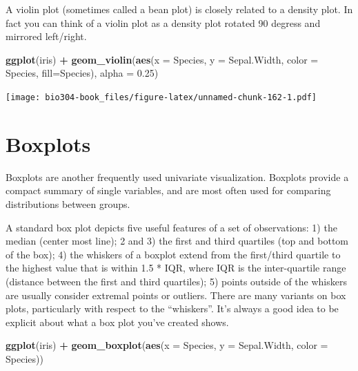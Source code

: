 \documentclass[]{book}
\newenvironment{Shaded}{\begin{snugshade}}{\end{snugshade}}
\newcommand{\DataTypeTok}[1]{\textcolor[rgb]{0.13,0.29,0.53}{#1}}
\newcommand{\FloatTok}[1]{\textcolor[rgb]{0.00,0.00,0.81}{#1}}
\newcommand{\KeywordTok}[1]{\textcolor[rgb]{0.13,0.29,0.53}{\textbf{#1}}}
\newcommand{\NormalTok}[1]{#1}
\newcommand{\OperatorTok}[1]{\textcolor[rgb]{0.81,0.36,0.00}{\textbf{#1}}}
\newcommand{\StringTok}[1]{\textcolor[rgb]{0.31,0.60,0.02}{#1}}
\theoremstyle{definition}
\theoremstyle{definition}
\theoremstyle{definition}
\theoremstyle{remark}
\begin{document}
A violin plot (sometimes called a bean plot) is closely related to a
density plot. In fact you can think of a violin plot as a density plot
rotated 90 degress and mirrored left/right.

\begin{Shaded}
\begin{Highlighting}[]
\KeywordTok{ggplot}\NormalTok{(iris) }\OperatorTok{+}\StringTok{ }
\StringTok{  }\KeywordTok{geom_violin}\NormalTok{(}\KeywordTok{aes}\NormalTok{(}\DataTypeTok{x =}\NormalTok{ Species, }\DataTypeTok{y =}\NormalTok{ Sepal.Width, }\DataTypeTok{color =}\NormalTok{ Species, }\DataTypeTok{fill=}\NormalTok{Species), }
              \DataTypeTok{alpha =} \FloatTok{0.25}\NormalTok{)}
\end{Highlighting}
\end{Shaded}

\texttt{[image: bio304-book\_files/figure-latex/unnamed-chunk-162-1.pdf]}

\hypertarget{boxplots}{%
\section{Boxplots}\label{boxplots}}

Boxplots are another frequently used univariate visualization. Boxplots
provide a compact summary of single variables, and are most often used
for comparing distributions between groups.

A standard box plot depicts five useful features of a set of
observations: 1) the median (center most line); 2 and 3) the first and
third quartiles (top and bottom of the box); 4) the whiskers of a
boxplot extend from the first/third quartile to the highest value that
is within 1.5 * IQR, where IQR is the inter-quartile range (distance
between the first and third quartiles); 5) points outside of the
whiskers are usually consider extremal points or outliers. There are
many variants on box plots, particularly with respect to the
``whiskers''. It's always a good idea to be explicit about what a box
plot you've created shows.

\begin{Shaded}
\begin{Highlighting}[]
\KeywordTok{ggplot}\NormalTok{(iris) }\OperatorTok{+}\StringTok{ }
\StringTok{  }\KeywordTok{geom_boxplot}\NormalTok{(}\KeywordTok{aes}\NormalTok{(}\DataTypeTok{x =}\NormalTok{ Species, }\DataTypeTok{y =}\NormalTok{ Sepal.Width, }\DataTypeTok{color =}\NormalTok{ Species))}
\end{Highlighting}
\end{Shaded}
\end{document}
